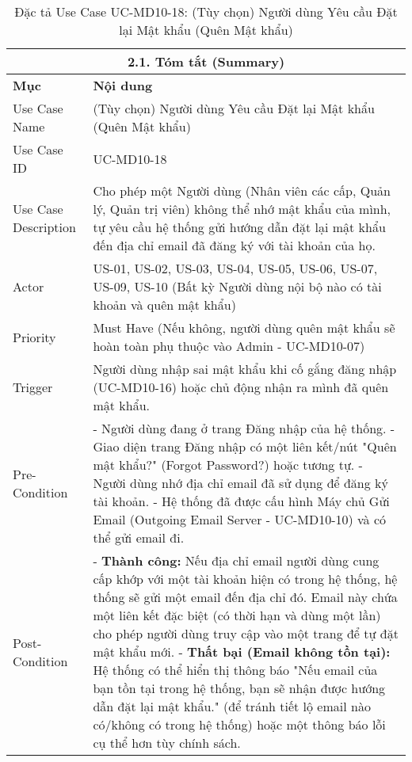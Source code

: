 \begin{longtable}{|m{4cm}|p{11cm}|}
\caption{Đặc tả Use Case UC-MD10-18: (Tùy chọn) Người dùng Yêu cầu Đặt lại Mật khẩu (Quên Mật khẩu)} \label{tab:uc_md10_18_forgot_password_in_codeblock} \\
\hline
\multicolumn{2}{|c|}{\textbf{2.1. Tóm tắt (Summary)}} \\
\hline
\textbf{Mục} & \textbf{Nội dung} \\
\hline
\endhead %
\midrule
\endfoot %
\bottomrule
\endlastfoot %
Use Case Name & (Tùy chọn) Người dùng Yêu cầu Đặt lại Mật khẩu (Quên Mật khẩu) \\
\hline
Use Case ID & UC-MD10-18 \\
\hline
Use Case Description & Cho phép một Người dùng (Nhân viên các cấp, Quản lý, Quản trị viên) không thể nhớ mật khẩu của mình, tự yêu cầu hệ thống gửi hướng dẫn đặt lại mật khẩu đến địa chỉ email đã đăng ký với tài khoản của họ. \\
\hline
Actor & US-01, US-02, US-03, US-04, US-05, US-06, US-07, US-09, US-10 (Bất kỳ Người dùng nội bộ nào có tài khoản và quên mật khẩu) \\
\hline
Priority & Must Have (Nếu không, người dùng quên mật khẩu sẽ hoàn toàn phụ thuộc vào Admin - UC-MD10-07) \\
\hline
Trigger & Người dùng nhập sai mật khẩu khi cố gắng đăng nhập (UC-MD10-16) hoặc chủ động nhận ra mình đã quên mật khẩu. \\
\hline
Pre-Condition & - Người dùng đang ở trang Đăng nhập của hệ thống. \newline - Giao diện trang Đăng nhập có một liên kết/nút "Quên mật khẩu?" (Forgot Password?) hoặc tương tự. \newline - Người dùng nhớ địa chỉ email đã sử dụng để đăng ký tài khoản. \newline - Hệ thống đã được cấu hình Máy chủ Gửi Email (Outgoing Email Server - UC-MD10-10) và có thể gửi email đi. \\
\hline
Post-Condition & - \textbf{Thành công:} Nếu địa chỉ email người dùng cung cấp khớp với một tài khoản hiện có trong hệ thống, hệ thống sẽ gửi một email đến địa chỉ đó. Email này chứa một liên kết đặc biệt (có thời hạn và dùng một lần) cho phép người dùng truy cập vào một trang để tự đặt mật khẩu mới. \newline - \textbf{Thất bại (Email không tồn tại):} Hệ thống có thể hiển thị thông báo "Nếu email của bạn tồn tại trong hệ thống, bạn sẽ nhận được hướng dẫn đặt lại mật khẩu." (để tránh tiết lộ email nào có/không có trong hệ thống) hoặc một thông báo lỗi cụ thể hơn tùy chính sách. \\

\end{longtable}
